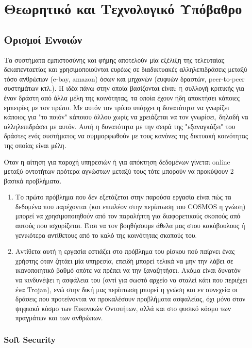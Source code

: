 \chapter{Θεωρητικό και Τεχνολογικό Υπόβαθρο}\label{ch:bkg}
\section{Ορισμοί Εννοιών}

Τα συστήματα εμπιστοσύνης και φήμης αποτελούν μία εξέλιξη της τελευταίας δεκαπενταετίας και χρησιμοποιούνται ευρέως σε διαδικτυακές αλληλεπιδράσεις μεταξύ τόσο ανθρώπων (e-bay, amazon) όσων και μηχανών (ευφυών δραστών, peer-to-peer συστημάτων κτλ.). Η ιδέα πάνω στην οποία βασίζονται είναι: η συλλογή κριτικής για έναν δράστη από άλλα μέλη της κοινότητας, τα οποία έχουν ήδη αποκτήσει κάποιες εμπειρίες με τον πρώτο. Με αυτόν τον τρόπο υπάρχει η δυνατότητα να γνωρίζει κάποιος για "το ποιόν"  κάποιου άλλου χωρίς να χρειάζεται να τον γνωρίσει, δηλαδή να αλληλεπιδράσει με αυτόν. Αυτή η δυνατότητα με την σειρά της "εξαναγκάζει" του δράστες ενός συστήματος να συμμορφωθούν με τους κανόνες της δικτυακή κοινότητας της οποίας είναι μέλη.

Όταν η αίτηση για παροχή υπηρεσιών ή για απόκτηση δεδομένων γίνεται online μεταξύ οντοτήτων πρότερα αγνώστων μεταξύ τους τότε μπορούν να προκύψουν 2 βασικά προβλήματα.
\begin{enumerate}
\item Το πρώτο πρόβλημα που δεν εξετάζεται στην παρούσα εργασία είναι πώς τα δεδομένα που παρέχονται (και επιπλέον στην περίπτωση του COSMOS η γνώση) μπορεί να χρησιμοποιηθούν από τον παραλήπτη για διαφορετικούς σκοπούς από αυτούς που ισχυρίζεται. Έτσι να τον βοηθήσουμε άθελα μας στου κακόβουλους ή γενικότερα αντίθετους από το καλό της κοινότητας σκοπούς του.

\item Αντίθετα αυτή η εργασία εστιάζει στο πρόβλημα του ρίσκου πού παίρνει ένας χρήστης όταν ζητάει μία υπηρεσία, επειδή μπορεί τελικά να μην την λάβει σε ικανοποιητικό βαθμό οπότε να πρέπει να την ξαναζητήσει. Ακόμα είναι δυνατόν να κινδυνέψει η ασφάλεια του (αντί για σωστό αρχείο να σταλεί κάτι που περιέχει ένα Trojan), ενώ στην δική μας περίπτωση μπορεί η γνώση και εν συνεχεία οι δράσεις που προτείνονται να προκαλέσουν προβλήματα ασφαλείας, όχι μόνο στον ψηφιακό κόσμο  των Εικονικών Οντοτήτων, αλλά και στο φυσικό κόσμο των πραγμάτων και των ανθρώπων.
\end{enumerate}
\newpage
\subsection{Soft Security}

